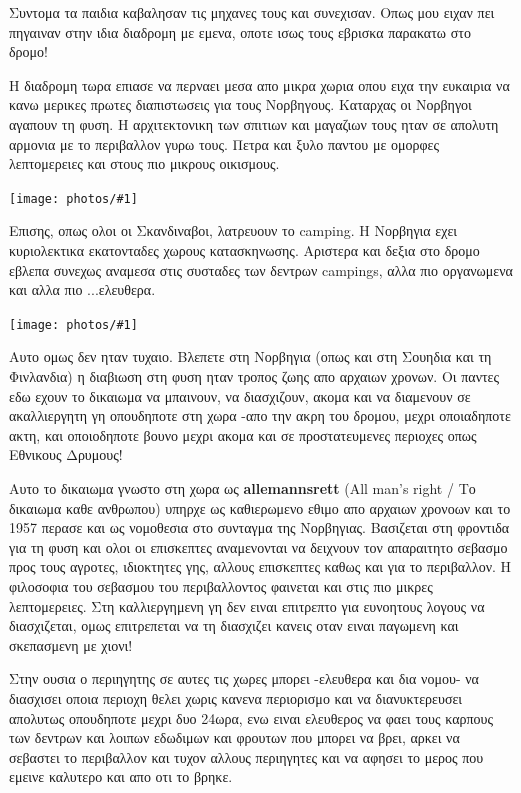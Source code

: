 \documentclass[11pt, letterpaper]{book}
\newcommand\photo[1]{\begin{center}\noindent\texttt{[image: photos/\#1]}\end{center}}
\begin{document}
Συντομα τα παιδια καβαλησαν τις μηχανες τους και συνεχισαν. Οπως μου ειχαν πει πηγαιναν στην ιδια διαδρομη με εμενα, οποτε ισως τους εβρισκα παρακατω στο δρομο! 

Η διαδρομη τωρα επιασε να περναει μεσα απο μικρα χωρια οπου ειχα την ευκαιρια να κανω μερικες πρωτες διαπιστωσεις για τους Νορβηγους. 
Καταρχας οι Νορβηγοι αγαπουν τη φυση.
Η αρχιτεκτονικη των σπιτιων και μαγαζιων τους ηταν σε απολυτη αρμονια με το περιβαλλον γυρω τους. 
Πετρα και ξυλο παντου με ομορφες λεπτομερειες και στους πιο μικρους οικισμους.

\photo{161.jpg}

Επισης, οπως ολοι οι Σκανδιναβοι, λατρευουν το camping. Η Νορβηγια εχει κυριολεκτικα εκατονταδες χωρους κατασκηνωσης. Αριστερα και δεξια στο δρομο εβλεπα συνεχως αναμεσα στις συσταδες των δεντρων campings, αλλα πιο οργανωμενα και αλλα πιο ...ελευθερα.

\photo{162.jpg}

Αυτο ομως δεν ηταν τυχαιο. 
Βλεπετε στη Νορβηγια (οπως και στη Σουηδια και τη Φινλανδια) η διαβιωση στη φυση ηταν τροπος ζωης απο αρχαιων χρονων. 
Οι παντες εδω εχουν το δικαιωμα να μπαινουν, να διασχιζουν, ακομα και να διαμενουν σε ακαλλιεργητη γη οπουδηποτε στη χωρα -απο την ακρη του δρομου, μεχρι οποιαδηποτε ακτη, και οποιοδηποτε βουνο μεχρι ακομα και σε προστατευμενες περιοχες οπως Εθνικους Δρυμους!

Αυτο το δικαιωμα γνωστο στη χωρα ως \textbf{allemannsrett} (All man's right / Το δικαιωμα καθε ανθρωπου) υπηρχε ως καθιερωμενο εθιμο απο αρχαιων χρονοων και το 1957 περασε και ως νομοθεσια στο συνταγμα της Νορβηγιας. 
Βασιζεται στη φροντιδα για τη φυση και ολοι οι επισκεπτες αναμενονται να δειχνουν τον απαραιτητο σεβασμο προς τους αγροτες, ιδιοκτητες γης, αλλους επισκεπτες καθως και για το περιβαλλον. 
Η φιλοσοφια του σεβασμου του περιβαλλοντος φαινεται και στις πιο μικρες λεπτομερειες. Στη καλλιεργημενη γη δεν ειναι επιτρεπτο για ευνοητους λογους να διασχιζεται, ομως επιτρεπεται να τη διασχιζει κανεις οταν ειναι παγωμενη και σκεπασμενη με χιονι! 

Στην ουσια ο περιηγητης σε αυτες τις χωρες μπορει -ελευθερα και δια νομου- να διασχισει οποια περιοχη θελει χωρις κανενα περιορισμο και να διανυκτερευσει απολυτως οπουδηποτε μεχρι δυο 24ωρα, ενω ειναι ελευθερος να φαει τους καρπους των δεντρων και λοιπων εδωδιμων και φρουτων που μπορει να βρει, αρκει να σεβαστει το περιβαλλον και τυχον αλλους περιηγητες και να αφησει το μερος που εμεινε καλυτερο και απο οτι το βρηκε.
\end{document}
